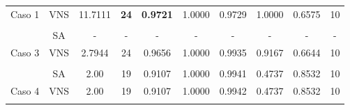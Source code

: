 \begin{table}
{\begin{tabular}{cccccccccc}
			\multicolumn{1}{c|}{\multirow{-2}{*}{Caso 1}} & VNS & 11.7111                                                              & {\color[HTML]{9A0000} \textbf{24}}                                 & {\color[HTML]{9A0000} \textbf{0.9721}}                  & 1.0000 & 0.9729 & 1.0000 & 0.6575 & 10           \\
			&     &                                                                      &                                                                    &                                                         &        &        &        &        &              \\
			\multicolumn{1}{c|}{}                         & SA  & -                                                                    & -                                                                  & -                                                       & -      & -      & -      & -      & -            \\
			\multicolumn{1}{c|}{\multirow{-2}{*}{Caso 3}} & VNS & 2.7944                                                              & 24                                                                 & 0.9656                                                  & 1.0000 & 0.9935 & 0.9167 & 0.6644 & 10           \\
			&     &                                                                      &                                                                    &                                                         &        &        &        &        &              \\
			\multicolumn{1}{c|}{}                         & SA  & 2.00                                                                 & 19                                                                 & 0.9107                                                  & 1.0000 & 0.9941 & 0.4737 & 0.8532 & 10           \\
			\multicolumn{1}{c|}{\multirow{-2}{*}{Caso 4}} & VNS & 2.00                                                               & 19                                                                 & 0.9107                                                  & 1.0000 & 0.9942 & 0.4737 & 0.8532 & 10           \\
			&     &                                                                      &                                                                    &                                                         &        &        &        &        &              \\

\end{tabular}}
\end{table}
